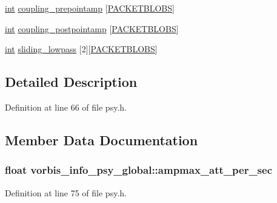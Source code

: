\begin{DoxyCompactItemize}
\item 
\hyperlink{xmltok_8h_a5a0d4a5641ce434f1d23533f2b2e6653}{int} \hyperlink{structvorbis__info__psy__global_a42cf86f4d73118ff0e6af63cf1f96b1b}{coupling\+\_\+prepointamp} \mbox{[}\hyperlink{codec__internal_8h_a9293c5a15a78abadbe212d944080e04b}{P\+A\+C\+K\+E\+T\+B\+L\+O\+BS}\mbox{]}
\item 
\hyperlink{xmltok_8h_a5a0d4a5641ce434f1d23533f2b2e6653}{int} \hyperlink{structvorbis__info__psy__global_a308dce72e7dc0a4ad1f33fc760f454f0}{coupling\+\_\+postpointamp} \mbox{[}\hyperlink{codec__internal_8h_a9293c5a15a78abadbe212d944080e04b}{P\+A\+C\+K\+E\+T\+B\+L\+O\+BS}\mbox{]}
\item 
\hyperlink{xmltok_8h_a5a0d4a5641ce434f1d23533f2b2e6653}{int} \hyperlink{structvorbis__info__psy__global_a5d1433d9b0be686fcb7e9a9060457118}{sliding\+\_\+lowpass} \mbox{[}2\mbox{]}\mbox{[}\hyperlink{codec__internal_8h_a9293c5a15a78abadbe212d944080e04b}{P\+A\+C\+K\+E\+T\+B\+L\+O\+BS}\mbox{]}
\end{DoxyCompactItemize}


\subsection{Detailed Description}


Definition at line 66 of file psy.\+h.



\subsection{Member Data Documentation}
\subsubsection[{\texorpdfstring{ampmax\+\_\+att\+\_\+per\+\_\+sec}{ampmax_att_per_sec}}]{\setlength{\rightskip}{0pt plus 5cm}float vorbis\+\_\+info\+\_\+psy\+\_\+global\+::ampmax\+\_\+att\+\_\+per\+\_\+sec}\hypertarget{structvorbis__info__psy__global_ad928858e7853b161d92c034fdf654265}{}\label{structvorbis__info__psy__global_ad928858e7853b161d92c034fdf654265}


Definition at line 75 of file psy.\+h.

